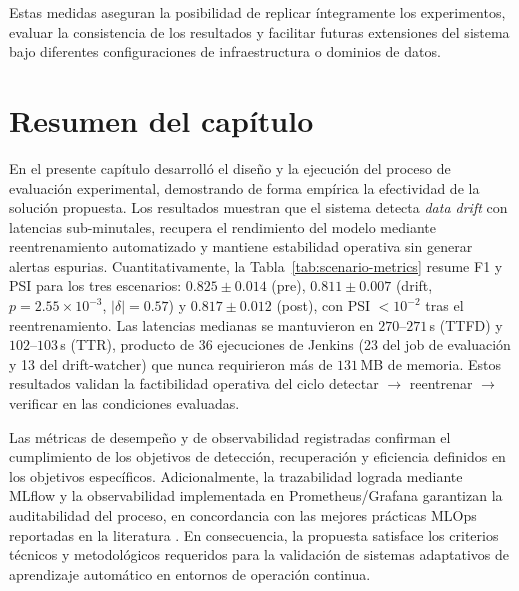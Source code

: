 Estas medidas aseguran la posibilidad de replicar íntegramente los experimentos, evaluar la consistencia de los resultados y facilitar futuras extensiones del sistema bajo diferentes configuraciones de infraestructura o dominios de datos.

\section{Resumen del capítulo}

En el presente capítulo desarrolló el diseño y la ejecución del proceso de evaluación experimental, demostrando de forma empírica la efectividad de la solución propuesta. Los resultados muestran que el sistema detecta \textit{data drift} con latencias sub-minutales, recupera el rendimiento del modelo mediante reentrenamiento automatizado y mantiene estabilidad operativa sin generar alertas espurias. Cuantitativamente, la Tabla~\ref{tab:scenario-metrics} resume F1 y PSI para los tres escenarios: $0.825\pm0.014$ (pre), $0.811\pm0.007$ (drift, $p=2.55\times10^{-3}$, $|\delta|=0.57$) y $0.817\pm0.012$ (post), con PSI $<10^{-2}$ tras el reentrenamiento. Las latencias medianas se mantuvieron en $270$--$271$\,s (TTFD) y $102$--$103$\,s (TTR), producto de 36 ejecuciones de Jenkins (23 del job de evaluación y 13 del drift-watcher) que nunca requirieron más de $131$\,MB de memoria. Estos resultados validan la factibilidad operativa del ciclo detectar $\rightarrow$ reentrenar $\rightarrow$ verificar en las condiciones evaluadas.

Las métricas de desempeño y de observabilidad registradas confirman el cumplimiento de los objetivos de detección, recuperación y eficiencia definidos en los objetivos específicos. Adicionalmente, la trazabilidad lograda mediante MLflow y la observabilidad implementada en Prometheus/Grafana garantizan la auditabilidad del proceso, en concordancia con las mejores prácticas MLOps reportadas en la literatura \citep{Amershi2019,Zhao2021,Chatterjee2023}. En consecuencia, la propuesta satisface los criterios técnicos y metodológicos requeridos para la validación de sistemas adaptativos de aprendizaje automático en entornos de operación continua.
